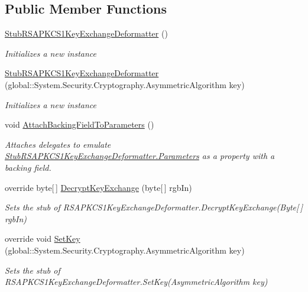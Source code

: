 \subsection*{Public Member Functions}
\begin{DoxyCompactItemize}
\item 
\hyperlink{class_system_1_1_security_1_1_cryptography_1_1_fakes_1_1_stub_r_s_a_p_k_c_s1_key_exchange_deformatter_a0d0e5e78da567d040a412a95dc7c0875}{Stub\-R\-S\-A\-P\-K\-C\-S1\-Key\-Exchange\-Deformatter} ()
\begin{DoxyCompactList}\small\item\em Initializes a new instance\end{DoxyCompactList}\item 
\hyperlink{class_system_1_1_security_1_1_cryptography_1_1_fakes_1_1_stub_r_s_a_p_k_c_s1_key_exchange_deformatter_af9d9e5181b498bfe50053d7c0d9c0af1}{Stub\-R\-S\-A\-P\-K\-C\-S1\-Key\-Exchange\-Deformatter} (global\-::\-System.\-Security.\-Cryptography.\-Asymmetric\-Algorithm key)
\begin{DoxyCompactList}\small\item\em Initializes a new instance\end{DoxyCompactList}\item 
void \hyperlink{class_system_1_1_security_1_1_cryptography_1_1_fakes_1_1_stub_r_s_a_p_k_c_s1_key_exchange_deformatter_afceea08bc8ca1ded7bb6b6ad976ff761}{Attach\-Backing\-Field\-To\-Parameters} ()
\begin{DoxyCompactList}\small\item\em Attaches delegates to emulate \hyperlink{class_system_1_1_security_1_1_cryptography_1_1_fakes_1_1_stub_r_s_a_p_k_c_s1_key_exchange_deformatter_a73e9a896bd15c7f421ccfe99330f1323}{Stub\-R\-S\-A\-P\-K\-C\-S1\-Key\-Exchange\-Deformatter.\-Parameters} as a property with a backing field.\end{DoxyCompactList}\item 
override byte\mbox{[}$\,$\mbox{]} \hyperlink{class_system_1_1_security_1_1_cryptography_1_1_fakes_1_1_stub_r_s_a_p_k_c_s1_key_exchange_deformatter_a17e50e24c7d10f1dddf13b618f34b1e5}{Decrypt\-Key\-Exchange} (byte\mbox{[}$\,$\mbox{]} rgb\-In)
\begin{DoxyCompactList}\small\item\em Sets the stub of R\-S\-A\-P\-K\-C\-S1\-Key\-Exchange\-Deformatter.\-Decrypt\-Key\-Exchange(\-Byte\mbox{[}$\,$\mbox{]} rgb\-In)\end{DoxyCompactList}\item 
override void \hyperlink{class_system_1_1_security_1_1_cryptography_1_1_fakes_1_1_stub_r_s_a_p_k_c_s1_key_exchange_deformatter_af02d9b99eb5a11e51fb360e1c7dace5d}{Set\-Key} (global\-::\-System.\-Security.\-Cryptography.\-Asymmetric\-Algorithm key)
\begin{DoxyCompactList}\small\item\em Sets the stub of R\-S\-A\-P\-K\-C\-S1\-Key\-Exchange\-Deformatter.\-Set\-Key(\-Asymmetric\-Algorithm key)\end{DoxyCompactList}\end{DoxyCompactItemize}

